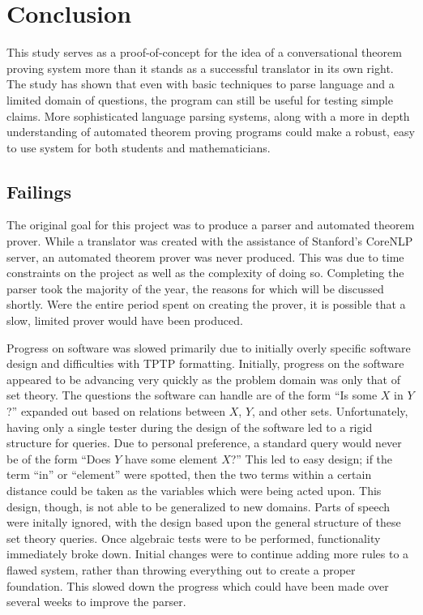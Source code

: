 \chapter{Conclusion}

This study serves as a proof-of-concept for the idea of a conversational theorem proving system more than it stands as a successful translator in its own right. The study has shown that even with basic techniques to parse language and a limited domain of questions, the program can still be useful for testing simple claims. More sophisticated language parsing systems, along with a more in depth understanding of automated theorem proving programs could make a robust, easy to use system for both students and mathematicians.

\section{Failings}

The original goal for this project was to produce a parser and automated theorem prover. While a translator was created with the assistance of Stanford's CoreNLP server, an automated theorem prover was never produced. This was due to time constraints on the project as well as the complexity of doing so. Completing the parser took the majority of the year, the reasons for which will be discussed shortly. Were the entire period spent on creating the prover, it is possible that a slow, limited prover would have been produced.

Progress on software was slowed primarily due to initially overly specific software design and difficulties with TPTP formatting. Initially, progress on the software appeared to be advancing very quickly as the problem domain was only that of set theory. The questions the software can handle are of the form ``Is some $X$ in $Y$?'' expanded out based on relations between $X$, $Y$, and other sets. Unfortunately, having only a single tester during the design of the software led to a rigid structure for queries. Due to personal preference, a standard query would never be of the form ``Does $Y$ have some element $X$?'' This led to easy design; if the term ``in'' or ``element'' were spotted, then the two terms within a certain distance could be taken as the variables which were being acted upon. This design, though, is not able to be generalized to new domains. Parts of speech were initally ignored, with the design based upon the general structure of these set theory queries. Once algebraic tests were to be performed, functionality immediately broke down. Initial changes were to continue adding more rules to a flawed system, rather than throwing everything out to create a proper foundation. This slowed down the progress which could have been made over several weeks to improve the parser.

